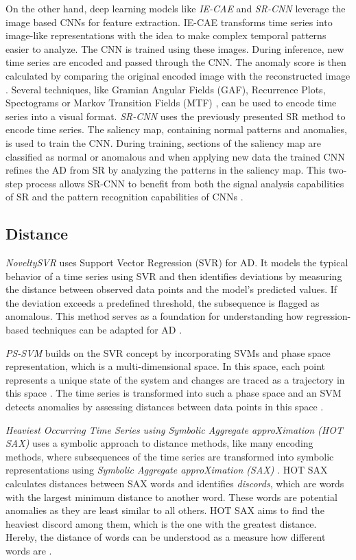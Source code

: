On the other hand, deep learning models like \textit{IE-CAE} and \textit{SR-CNN} leverage the image based CNNs for feature extraction. IE-CAE transforms time series into image-like representations with the idea to make complex temporal patterns easier to analyze. The CNN is trained using these images. During inference, new time series are encoded and passed through the CNN. The anomaly score is then calculated by comparing the original encoded image with the reconstructed image  \cite{IE-CAE}. Several techniques, like Gramian Angular Fields (GAF), Recurrence Plots, Spectograms or Markov Transition Fields (MTF) \cite{Wang2015, Goswami2019, Chaurasiya2020}, can be used to encode time series into a visual format.
\textit{SR-CNN} uses the previously presented SR method to encode time series. The saliency map, containing normal patterns and anomalies, is used to train the CNN. During training, sections of the saliency map are classified as normal or anomalous and when applying new data the trained CNN refines the AD from SR by analyzing the patterns in the saliency map. This two-step process allows SR-CNN to benefit from both the signal analysis capabilities of SR and the pattern recognition capabilities of CNNs \cite{SR-CNN}.


\subsection{Distance}
\textit{NoveltySVR} uses Support Vector Regression (SVR) \cite{Cristianini2008} for AD. It models the typical behavior of a time series using SVR and then identifies deviations by measuring the distance between observed data points and the model's predicted values. If the deviation exceeds a predefined threshold, the subsequence is flagged as anomalous. This method serves as a foundation for understanding how regression-based techniques can be adapted for AD \cite{NoveltySVR}.

\textit{PS-SVM} builds on the SVR concept by incorporating SVMs and phase space representation, which is a multi-dimensional space. In this space, each point represents a unique state of the system and changes are traced as a trajectory in this space \cite{Conti2023}. The time series is transformed into such a phase space and an SVM detects anomalies by assessing distances between data points in this space \cite{PS-SVM}.

\textit{Heaviest Occurring Time Series using Symbolic Aggregate approXimation (HOT SAX)} uses a symbolic approach to distance methods, like many encoding methods, where subsequences of the time series are transformed into symbolic representations using \textit{Symbolic Aggregate approXimation (SAX)} \cite{SAX}. HOT SAX calculates distances between SAX words and identifies \textit{discords}, which are words with the largest minimum distance to another word. These words are potential anomalies as they are least similar to all others. HOT SAX aims to find the heaviest discord among them, which is the one with the greatest distance. Hereby, the distance of words can be understood as a measure how different words are \cite{HOT_SAX}.

